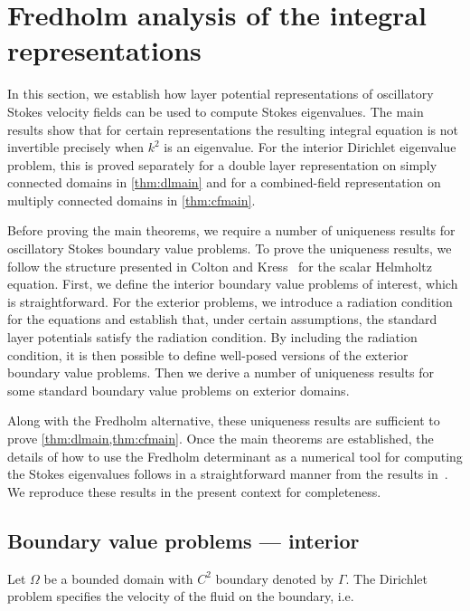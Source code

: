 \section{Fredholm analysis of the integral representations}
\label{sec:analysis}
In this section, we establish how layer potential
representations of oscillatory Stokes velocity fields
can be used to compute Stokes eigenvalues.
%
The main results show that for certain representations
the resulting integral equation is not invertible precisely
when $k^2$ is an eigenvalue.
%
For the interior Dirichlet eigenvalue problem, this is
proved separately for a double layer representation on
simply connected domains in \cref{thm:dlmain} and
for a combined-field representation on multiply connected
domains in \cref{thm:cfmain}.
%

Before proving the main theorems, we require a number
of uniqueness results for oscillatory Stokes boundary
value problems.
%
To prove the uniqueness results, we follow the 
structure presented in Colton and Kress~\cite[Ch. 3]{colton1983integral}
for the scalar Helmholtz equation.
%
First, we define the interior boundary value problems
of interest, which is straightforward.
%
For the exterior problems, we introduce a radiation condition
for the equations and establish that, under certain assumptions,
the standard layer potentials satisfy the radiation condition.
%
By including the radiation condition, it is then
possible to define well-posed versions of the
exterior boundary value problems.
%
Then we derive a number of uniqueness
results for some standard boundary value problems
on exterior domains.


Along with the Fredholm alternative, these uniqueness
results are sufficient to prove
\cref{thm:dlmain,thm:cfmain}.
%
Once the main theorems are established,
the details of how to use the Fredholm determinant
as a numerical tool for computing the Stokes eigenvalues
follows in a straightforward manner from the results
in~\cite{zhao2015robust}.
%
We reproduce these results in the present
context for completeness.

\subsection{Boundary value problems --- interior}

Let $\Omega$ be a bounded domain with $C^2$ boundary
denoted by $\Gamma$.
The Dirichlet problem specifies the
velocity of the fluid on the boundary, i.e.

